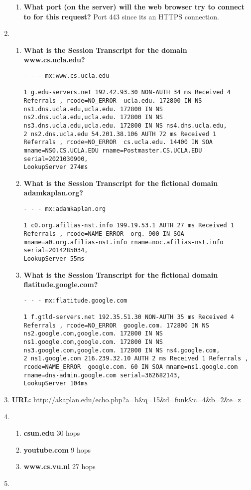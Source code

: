 \documentclass{article}
\begin{document}
\begin{enumerate}
\begin{enumerate}
        \item \textbf{What port (on the server) will the web browser try to connect to for this request?} \newline Port 443 since its an HTTPS connection. 
    \end{enumerate}
    \item \begin{enumerate}
        \item \textbf{What is the Session Transcript for the domain www.cs.ucla.edu?} \newline \begin{lstlisting}
- - - mx:www.cs.ucla.edu

1 g.edu-servers.net 192.42.93.30 NON-AUTH 34 ms Received 4 Referrals , rcode=NO_ERROR  ucla.edu. 172800 IN NS ns1.dns.ucla.edu,ucla.edu. 172800 IN NS ns2.dns.ucla.edu,ucla.edu. 172800 IN NS ns3.dns.ucla.edu,ucla.edu. 172800 IN NS ns4.dns.ucla.edu,
2 ns2.dns.ucla.edu 54.201.38.106 AUTH 72 ms Received 1 Referrals , rcode=NO_ERROR  cs.ucla.edu. 14400 IN SOA mname=NS0.CS.UCLA.EDU rname=Postmaster.CS.UCLA.EDU serial=2021030900,
LookupServer 274ms
        \end{lstlisting}
        \item \textbf{What is the Session Transcript for the fictional domain adamkaplan.org?} \newline \begin{lstlisting}
- - - mx:adamkaplan.org

1 c0.org.afilias-nst.info 199.19.53.1 AUTH 27 ms Received 1 Referrals , rcode=NAME_ERROR  org. 900 IN SOA mname=a0.org.afilias-nst.info rname=noc.afilias-nst.info serial=2014285034,
LookupServer 55ms 
       \end{lstlisting}
       \item \textbf{What is the Session Transcript for the fictional domain flatitude.google.com?} \newline \begin{lstlisting}
- - - mx:flatitude.google.com

1 f.gtld-servers.net 192.35.51.30 NON-AUTH 35 ms Received 4 Referrals , rcode=NO_ERROR  google.com. 172800 IN NS ns2.google.com,google.com. 172800 IN NS ns1.google.com,google.com. 172800 IN NS ns3.google.com,google.com. 172800 IN NS ns4.google.com,
2 ns1.google.com 216.239.32.10 AUTH 2 ms Received 1 Referrals , rcode=NAME_ERROR  google.com. 60 IN SOA mname=ns1.google.com rname=dns-admin.google.com serial=362682143,
LookupServer 104ms
       \end{lstlisting}
    \end{enumerate}
    \item \textbf{URL:} http://akaplan.edu/echo.php?a=b\&q=15\&d=funk\&c=4\&b=2\&e=z
    \item \begin{enumerate}
        \item \textbf{csun.edu} 30 hops
        \item \textbf{youtube.com} 9 hops
        \item \textbf{www.cs.vu.nl} 27 hops
    \end{enumerate}
    \item 
\end{enumerate}
\end{document}
